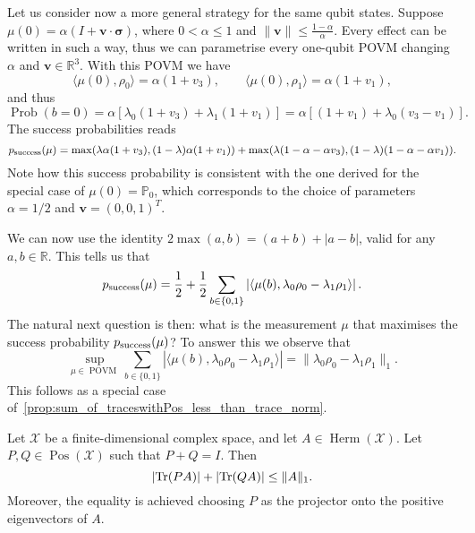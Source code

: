 \documentclass[12pt]{report}
\newcommand{\PP}{\mathbb{P}}
\newcommand{\RR}{\mathbb{R}}
\newcommand{\on}[1]{\operatorname{#1}}
\newcommand{\bs}[1]{\boldsymbol{#1}}
\newcommand{\calX}{{\mathcal{X}}}
\DeclareMathOperator{\Pos}{Pos}
\DeclareMathOperator{\Herm}{Herm}
\DeclareMathOperator{\Prob}{Prob}
\begin{document}
\begin{example}
	Let us consider now a more general strategy for the same qubit states.
	Suppose $\mu(0)= \alpha(I+\bs v\cdot\bs\sigma)$, where $0<\alpha\le1$ and $\|\bs v\|\le \frac{1-\alpha}{\alpha}$. Every effect can be written in such a way, thus we can parametrise every one-qubit POVM changing $\alpha$ and $\bs v\in\RR^3$. With this POVM we have
	\begin{equation}
		\langle\mu(0),\rho_0\rangle = \alpha(1+v_3),
		\qquad
		\langle\mu(0),\rho_1\rangle = \alpha(1+v_1),
	\end{equation}
	and thus
	\begin{equation}
		\Prob(b=0) = \alpha[\lambda_0(1+v_3) + \lambda_1(1+v_1)]
		= \alpha[(1+v_1) + \lambda_0 (v_3-v_1)].
	\end{equation}
	The success probabilities reads
	\begin{equation}
		p_{\rm success}(\mu)
		= \max(
		\lambda\alpha(1+v_3),
		(1-\lambda)\alpha(1+v_1)
		) +
		\max(
		\lambda(1-\alpha-\alpha v_3),
		(1-\lambda)(1-\alpha-\alpha v_1)
		).
		\label{eq:QST:success_prob_in_example_general_POVM}
	\end{equation}
	Note how this success probability is consistent with the one derived for the special case of $\mu(0)=\PP_0$, which corresponds to the choice of parameters $\alpha=1/2$ and $\bs v=(0,0,1)^T$.
\end{example}


We can now use the identity $2\max(a,b)=(a+b)+|a-b|$, valid for any $a,b\in\RR$. This tells us that
\begin{equation}
	p_{\rm success}(\mu)
	= \frac12 + \frac12
	\sum_{b\in\{0,1\}} \left\lvert
	\langle\mu(b), \lambda_0 \rho_0 - \lambda_1\rho_1\rangle
	\right\rvert.
\end{equation}
The natural next question is then: what is the measurement $\mu$ that maximises the success probability $p_{\rm success}(\mu)$?
To answer this we observe that
\begin{equation}
	\sup_{\mu\in\on{POVM}}
	\sum_{b\in\{0,1\}} \left\lvert
	\langle\mu(b), \lambda_0 \rho_0 - \lambda_1\rho_1\rangle
	\right\rvert
	= \|\lambda_0 \rho_0 - \lambda_1\rho_1\|_1.
\end{equation}
This follows as a special case of~\cref{prop:sum_of_traceswithPos_less_than_trace_norm}.

\begin{prop}
	Let $\calX$ be a finite-dimensional complex space, and let $A\in\Herm(\calX)$.
	Let $P,Q\in\Pos(\calX)$ such that $P+Q=I$. Then
	\begin{equation}
		\lvert \Tr(PA)\rvert
		+ \lvert \Tr(QA)\rvert \le \|A\|_1.
	\end{equation}
	Moreover, the equality is achieved choosing $P$ as the projector onto the positive eigenvectors of $A$.
	\label{prop:sum_of_traceswithPos_less_than_trace_norm}
\end{prop}
\end{document}
